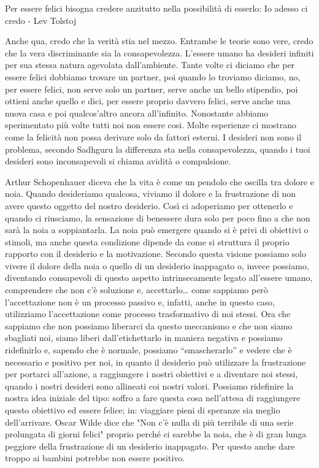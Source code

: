 \documentclass[12pt]{book} %
\begin{document}
Per essere felici bisogna credere anzitutto nella possibilità di esserlo: Io adesso ci credo - Lev Tolstoj 

Anche qua, credo che la verità stia nel mezzo. Entrambe le teorie sono vere, credo che la vera discriminante sia la
consapevolezza. L'essere umano ha desideri infiniti per sua stessa natura agevolata
dall'ambiente. Tante volte ci diciamo che per essere felici dobbiamo trovare un partner, poi
quando lo troviamo diciamo, no, per essere felici, non serve solo un partner, serve anche un bello stipendio, poi
ottieni anche quello e dici, per essere proprio davvero felici, serve anche una nuova casa e poi
qualcos'altro ancora all'infinito. Nonostante abbiamo sperimentato più
volte tutti noi non essere cosi. Molte esperienze ci mostrano come la felicità non possa derivare solo da fattori esterni. I desideri non sono il problema, secondo Sadhguru la differenza sta nella consapevolezza, quando i tuoi
desideri sono inconsapevoli si chiama avidità o compulsione. 

Arthur Schopenhauer diceva che la vita è come un pendolo che oscilla tra dolore e noia.
Quando desideriamo qualcosa, viviamo il dolore e la frustrazione di non avere questo oggetto del nostro desiderio. Così
ci adoperiamo per ottenerlo e quando ci riusciamo, la sensazione di benessere dura solo per poco fino a che non sarà la noia a soppiantarla. La noia può emergere quando si è privi di obiettivi o stimoli, ma anche questa condizione dipende da come si struttura il proprio rapporto con il desiderio e la motivazione.
Secondo questa visione possiamo solo vivere il dolore della noia o quello di un desiderio inappagato o, invece
possiamo, diventando consapevoli di questo aspetto intrinsecamente legato all'essere umano, 
comprendere che non c'è soluzione e, accettarlo… come sappiamo però
l'accettazione non è un processo passivo e, infatti, anche in questo caso, utilizziamo
l'accettazione come processo trasformativo di noi stessi. Ora che sappiamo che non possiamo
liberarci da questo meccanismo e che non siamo sbagliati noi, siamo liberi dall'etichettarlo in
maniera negativa e possiamo ridefinirlo e, sapendo che è normale, possiamo “smascherarlo” e vedere che è necessario e
positivo per noi, in quanto il desiderio può utilizzare la frustrazione per portarci all'azione, a
raggiungere i nostri obiettivi e a diventare noi stessi, quando i nostri desideri sono allineati coi nostri valori. Possiamo ridefinire la nostra idea iniziale del tipo: soffro a fare questa cosa
nell'attesa di raggiungere questo obiettivo ed essere felice; in: viaggiare pieni di speranze sia
meglio dell'arrivare. Oscar Wilde dice che "Non c'è nulla di più terribile di
una serie prolungata di giorni felici" proprio perché ci sarebbe la noia, che è di gran lunga
peggiore della frustrazione di un desiderio inappagato. Per questo anche dare troppo ai bambini potrebbe non essere
positivo.
\end{document}
